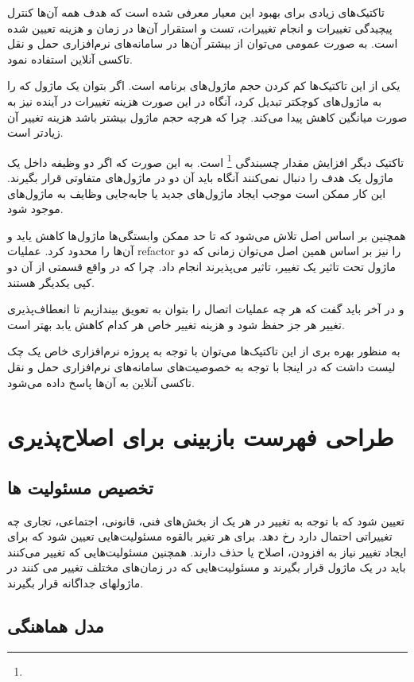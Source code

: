  تاکتیک‌های زیادی برای بهبود این معیار معرفی شده است که هدف همه آن‌ها کنترل پیچیدگی تغییرات و انجام تغییرات، تست و استقرار آن‌ها در زمان و هزینه تعیین شده است.
به صورت عمومی می‌توان از بیشتر ‌آن‌ها در سامانه‌های نرم‌افزاری حمل و نقل تاکسی آنلاین استفاده نمود.

یکی از این تاکتیک‌ها کم کردن حجم ماژول‌های برنامه است. اگر بتوان یک ماژول که را به ماژول‌های کوچکتر تبدیل کرد، آنگاه در این صورت هزینه تغییرات در آینده نیز به صورت میانگین کاهش پیدا می‌کند.
چرا که هرچه حجم ماژول بیشتر باشد هزینه تغییر آن زیادتر است.

تاکتیک دیگر افزایش مقدار چسبندگی
\footnote{}
است. به این صورت که اگر دو وظیفه داخل یک ماژول یک هدف را دنبال نمی‌کنند آنگاه باید آن دو در ماژول‌های متفاوتی قرار بگیرند.
این کار ممکن است موجب ایجاد ماژول‌های جدید یا جابه‌جایی وظایف به ماژول‌های موجود شود.

همچنین بر اساس اصل  تلاش می‌شود که تا حد ممکن وابستگی‌ها ماژول‌ها کاهش یاید و آن‌ها را محدود کرد. عملیات refactor را نیز بر اساس همین اصل می‌توان زمانی که دو ماژول تحت تاثیر یک تغییر، تاثیر می‌پذیرند انجام داد. چرا که در واقع قسمتی از آن دو کپی یکدیگر هستند.

و در آخر باید گفت که هر چه عملیات اتصال را بتوان به تعویق بیندازیم تا انعطاف‌پذیری تغییر هر جز حفظ شود و هزینه تغییر خاص هر کدام کاهش یابد بهتر است.


به منظور بهره بری از این تاکتیک‌ها می‌توان با توجه به پروژه نرم‌افزاری خاص یک چک لیست داشت که در اینجا با توجه به خصوصیت‌های سامانه‌های نرم‌افزاری حمل و نقل تاکسی آنلاین به آن‌ها پاسخ داده می‌شود.

\section{طراحی فهرست بازبینی برای اصلا‌ح‌پذیری}
\subsection{تخصیص مسئولیت ها} 
تعیین شود که با توجه به تغییر در هر یک از بخش‌های فنی، قانونی، اجتماعی، تجاری چه تغییراتی احتمال دارد رخ دهد. برای هر تغیر بالقوه مسئولیت‌هایی تعیین شود که برای ایجاد تغییر نیاز به افزودن، اصلاح یا حذف دارند.
همچنین مسئولیت‌هایی که تغییر می‌کنند باید در یک ماژول قرار بگیرند و مسئولیت‌هایی که در زمان‌های مختلف تغییر می کنند در ماژولهای جداگانه قرار بگیرند.

\subsection{مدل هماهنگی}

